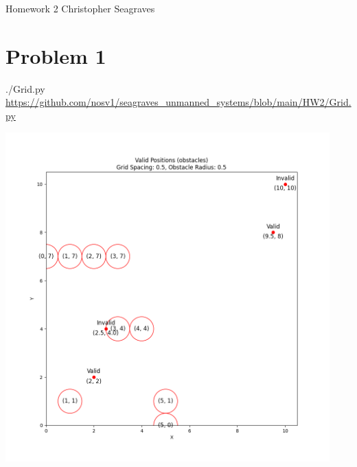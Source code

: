 \documentclass{article}
\begin{document}
    \raggedright
    Homework 2 \break
    Christopher Seagraves

    \section*{Problem 1}
    \begin{minipage}{\linewidth}
        \raggedright
        ./Grid.py \break
        \url{https://github.com/nosv1/seagraves_unmanned_systems/blob/main/HW2/Grid.py}
        \end{minipage}
        \begin{center}
            \includegraphics[height=5in]{HW2P1 Valid Positions.png}
        \end{center}
    
\end{document}
